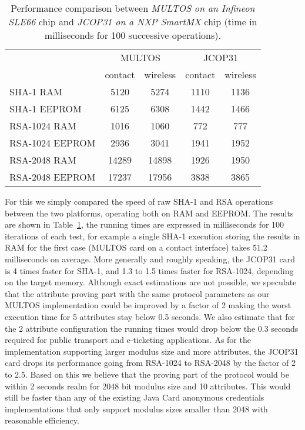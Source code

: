 \begin{table}[b]
  \centering
  \caption{Performance comparison between \emph{MULTOS on an Infineon
    SLE66} chip and \emph{JCOP31 on a NXP SmartMX} chip (time in
    milliseconds for 100 successive operations).}
  \label{tab:comparison}
  \renewcommand{\tabcolsep}{1.25mm}
  \renewcommand{\arraystretch}{1.25}
  \begin{tabular}{l|c|c|c|c|}
     & \multicolumn{2}{c|}{MULTOS} & \multicolumn{2}{c|}{JCOP31} \\
     & contact & wireless & contact & wireless \\\hline
    SHA-1 RAM        &  5120 &  5274 & 1110 & 1136 \\\hline
    SHA-1 EEPROM    &  6125 &  6308 & 1442 & 1466 \\\hline
    RSA-1024 RAM     &  1016 &  1060 &  772 &  777 \\\hline
    RSA-1024 EEPROM &  2936 &  3041 & 1941 & 1952 \\\hline
    RSA-2048 RAM     & 14289 & 14898 & 1926 & 1950 \\\hline
    RSA-2048 EEPROM & 17237 & 17956 & 3838 & 3865 \\\hline
  \end{tabular}
\end{table}

For this we simply compared the speed of raw SHA-1 and RSA operations
between the two platforms, operating both on RAM and EEPROM.  The
results are shown in Table~\ref{tab:comparison}, the running times are
expressed in milliseconds for 100 iterations of each test, for example
a single SHA-1 execution storing the results in RAM for the first case (MULTOS
card on a contact interface) takes 51.2 milliseconds on average.
More generally and roughly speaking,
the JCOP31 card is 4 times faster for SHA-1, and 1.3 to 1.5 times
faster for RSA-1024, depending on the target memory.
Although exact estimations are not possible, we
speculate that the attribute proving part with the same protocol
parameters as our MULTOS implementation could be improved by a factor
of 2 making the worst execution time for 5 attributes stay below 0.5 seconds.
We also estimate that for the 2 attribute configuration the running times
would drop below the 0.3 seconds required for public transport and e-ticketing applications.
As for the implementation supporting
larger modulus size and more attributes, the JCOP31 card drops
its performance going from RSA-1024 to RSA-2048 by the factor of 2 to 2.5.
Based on this we believe that the
proving part of the protocol would be within 2 seconds realm for 2048
bit modulus size and 10 attributes. This would still be faster
than any of the existing Java Card anonymous credentials
implementations that only support modulus sizes smaller than 2048
with reasonable efficiency.

